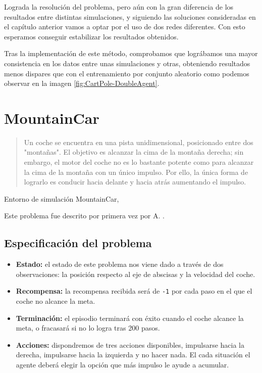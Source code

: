 Lograda la resolución del problema, pero aún con la gran diferencia de los resultados entre distintas simulaciones, y siguiendo las soluciones consideradas en el capítulo anterior vamos a optar por el uso de dos redes diferentes. Con esto esperamos conseguir estabilizar los resultados obtenidos.

Tras la implementación de este método, comprobamos que lográbamos una mayor consistencia en los datos entre unas simulaciones y otras, obteniendo resultados menos dispares que con el entrenamiento por conjunto aleatorio como podemos observar en la imagen \ref{fig:CartPole-DoubleAgent}.


\section{MountainCar}

\begin{quote}
    Un coche se encuentra en una pista unidimensional, posicionado entre dos "montañas". El objetivo es alcanzar la cima de la montaña derecha; sin embargo, el motor del coche no es lo bastante potente como para alcanzar la cima de la montaña con un único impulso. Por ello, la única forma de lograrlo es conducir hacia delante y hacia atrás aumentando el impulso.
\end{quote}

%
       {Entorno de simulación MountainCar, \citet{brockman2016openai}}

Este problema fue descrito por primera vez por A. \citet{Moore90efficientmemory-based}.

\subsection{Especificación del problema}

\begin{itemize}
    \item \textbf{Estado:} el estado de este problema nos viene dado a través de dos observaciones: la posición respecto al eje de abscisas y la velocidad del coche.
    \item \textbf{Recompensa:} la recompensa recibida será de \texttt{-1} por cada paso en el que el coche no alcance la meta.
    \item \textbf{Terminación:} el episodio terminará con éxito cuando el coche alcance la meta, o fracasará si no lo logra tras 200 pasos.
    \item \textbf{Acciones:} dispondremos de tres acciones disponibles, impulsarse hacia la derecha, impulsarse hacia la izquierda y no hacer nada. El cada situación el agente deberá elegir la opción que más impulso le ayude a acumular.
\end{itemize}

